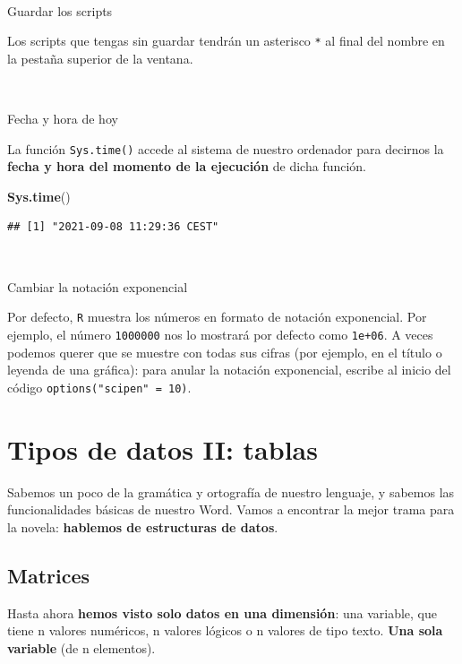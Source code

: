\documentclass[11pt,]{book}
\newenvironment{Shaded}{\begin{snugshade}}{\end{snugshade}}
\newcommand{\KeywordTok}[1]{\textcolor[rgb]{0.27,0.27,0.27}{\textbf{#1}}}
\newcommand{\NormalTok}[1]{#1}
\begin{document}
~

Guardar los scripts

Los scripts que tengas sin guardar tendrán un asterisco \texttt{*} al final del nombre en la pestaña superior de la ventana.

~

Fecha y hora de hoy

La función \texttt{Sys.time()} accede al sistema de nuestro ordenador para decirnos la \textbf{fecha y hora del momento de la ejecución} de dicha función.

\begin{Shaded}
\begin{Highlighting}[]
\KeywordTok{Sys.time}\NormalTok{()}
\end{Highlighting}
\end{Shaded}

\begin{verbatim}
## [1] "2021-09-08 11:29:36 CEST"
\end{verbatim}

~

Cambiar la notación exponencial

Por defecto, \texttt{R} muestra los números en formato de notación exponencial. Por ejemplo, el número \texttt{1000000} nos lo mostrará por defecto como \texttt{1e+06}. A veces podemos querer que se muestre con todas sus cifras (por ejemplo, en el título o leyenda de una gráfica): para anular la notación exponencial, escribe al inicio del código \texttt{options("scipen"\ =\ 10)}.

\hypertarget{datos}{%
\chapter{Tipos de datos II: tablas}\label{datos}}

Sabemos un poco de la gramática y ortografía de nuestro lenguaje, y sabemos las funcionalidades básicas de nuestro Word. Vamos a encontrar la mejor trama para la novela: \textbf{hablemos de estructuras de datos}.

\hypertarget{matrices}{%
\section{Matrices}\label{matrices}}

Hasta ahora \textbf{hemos visto solo datos en una dimensión}: una variable, que tiene n valores numéricos, n valores lógicos o n valores de tipo texto. \textbf{Una sola variable} (de n elementos).
\end{document}
